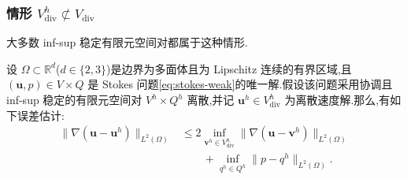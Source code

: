 \subsubsection{\texorpdfstring{情形 $V_{\mathrm{div}}^h\not\subset V_{\mathrm{div}}$}{情形 Vdivh 不包含于 Vdiv}}\label{sec:stokes-discrete-divergence-not-subspace}

\begin{note}\label{note:stokes-discrete-divergence-not-subspace}
大多数 inf-sup 稳定有限元空间对都属于这种情形.
\end{note}

\begin{theorem}\label{thm:stokes-error-velocity-h1}
设 $\Omega\subset\mathbb{R}^d$($d\in\{2,3\}$)是边界为多面体且为 Lipschitz 连续的有界区域,且 $(\bm{u},p)\in V\times Q$ 是 Stokes 问题\cref{eq:stokes-weak}的唯一解.假设该问题采用协调且 inf-sup 稳定的有限元空间对 $V^h\times Q^h$ 离散,并记 $\bm{u}^h\in V_{\mathrm{div}}^h$ 为离散速度解.那么,有如下误差估计:
\begin{equation}\label{eq:stokes-error-velocity-h1}
\begin{aligned}
  \|\nabla(\bm{u}-\bm{u}^h)\|_{L^2(\Omega)}
   &\leq 2\inf_{\bm{v}^h\in V_{\mathrm{div}}^h}
       \|\nabla(\bm{u}-\bm{v}^h)\|_{L^2(\Omega)}\\
   &\qquad+\inf_{q^h\in Q^h}
       \|p-q^h\|_{L^2(\Omega)}.
\end{aligned}
\end{equation}
\end{theorem}
